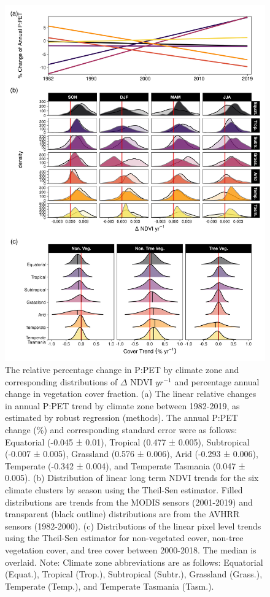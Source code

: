 \documentclass[gc, manuscript]{copernicus}
\begin{document}
\clearpage 
\begin{figure}
\includegraphics[width=12cm]{../../figures/Fig8_PPET_change_ThielSen_VCF} \caption{The relative percentage change in P:PET by climate zone and corresponding distributions of $\Delta$ NDVI $yr^{-1}$ and percentage annual change in vegetation cover fraction. (a) The linear relative changes in annual P:PET trend by climate zone between 1982-2019, as estimated by robust regression (methods). The annual P:PET change (\%) and corresponding standard error were as follows: Equatorial (-0.045 ± 0.01), Tropical (0.477 ± 0.005), Subtropical (-0.007 ± 0.005), Grassland (0.576 ± 0.006), Arid (-0.293 ± 0.006), Temperate (-0.342 ± 0.004), and Temperate Tasmania (0.047 ± 0.005). (b) Distribution of linear long term NDVI trends for the six climate clusters by season using the Theil-Sen estimator. Filled distributions are trends from the MODIS sensors (2001-2019) and transparent (black outline) distributions are from the AVHRR sensors (1982-2000). (c) Distributions of the linear pixel level trends using the Theil-Sen estimator for non-vegetated cover, non-tree vegetation cover, and tree cover between 2000-2018. The median is overlaid. \newline Note: Climate zone abbreviations are as follows: Equatorial (Equat.), Tropical (Trop.), Subtropical (Subtr.), Grassland (Grass.), Temperate (Temp.), and Temperate Tasmania (Tasm.).}\label{fig:unnamed-chunk-7}
\end{figure}
\clearpage
\end{document}
